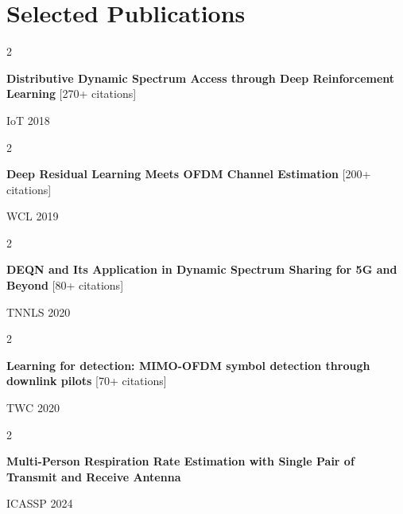 \documentclass[10pt, letterpaper]{article}
\newenvironment{twocolentryPub}[2][]{
    \onecolentry
    \def\secondColumn{#2}
    \setcolumnwidth{\fill, 2.4 cm}
    \begin{paracol}{2}
}{
    \switchcolumn \raggedleft \secondColumn
    \end{paracol}
    \endonecolentry
} %
\begin{document}
    

    \section{Selected Publications}



        
        \begin{samepage}
        
            \begin{twocolentryPub}{
                {\footnotesize IoT 2018}
            }
                {\footnotesize \textbf{Distributive Dynamic Spectrum Access through Deep Reinforcement Learning} } [270+ citations]
            \end{twocolentryPub}

            \vspace{0.05 cm}

            \begin{twocolentryPub}{
                {\footnotesize WCL 2019}
            }
                {\footnotesize \textbf{Deep Residual Learning Meets OFDM Channel Estimation}} [200+ citations]
            \end{twocolentryPub}

            \vspace{0.05 cm}

            \begin{twocolentryPub}{
                {\footnotesize TNNLS 2020}
            }
                {\footnotesize \textbf{DEQN and Its Application in Dynamic Spectrum Sharing for 5G and Beyond}} [80+ citations]
            \end{twocolentryPub}

            \vspace{0.05 cm}

            \begin{twocolentryPub}{
                {\footnotesize TWC 2020}
            }
                {\footnotesize \textbf{Learning for detection: MIMO-OFDM symbol detection through downlink pilots}} [70+ citations]
            \end{twocolentryPub}

            \vspace{0.05 cm}

            \begin{twocolentryPub}{
                {\footnotesize ICASSP 2024}
            }
                {\footnotesize \textbf{Multi-Person Respiration Rate Estimation with Single Pair of Transmit and Receive Antenna}}
            \end{twocolentryPub}


\end{samepage}
\end{document}
